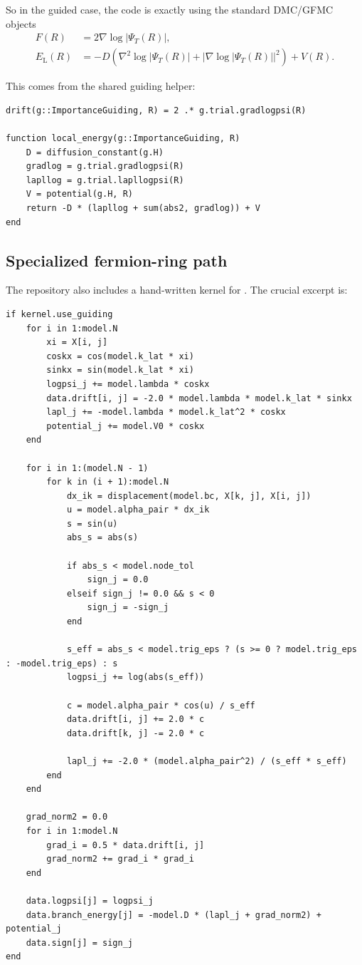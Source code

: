 \documentclass[11pt]{article}
\newcommand{\code}[1]{\texttt{\detokenize{#1}}}
\newcommand{\EL}{E_{\mathrm{L}}}
\begin{document}
So in the guided case, the code is exactly using the standard DMC/GFMC objects
\begin{align}
F(R) &= 2\nabla \log |\Psi_T(R)|, \\
\EL(R) &= -D\left(\nabla^2 \log |\Psi_T(R)| + |\nabla \log |\Psi_T(R)||^2\right) + V(R).
\end{align}

This comes from the shared guiding helper:

\begin{lstlisting}[style=codeblock,caption={\code{src/Domain/guiding.jl}}]
drift(g::ImportanceGuiding, R) = 2 .* g.trial.gradlogpsi(R)

function local_energy(g::ImportanceGuiding, R)
    D = diffusion_constant(g.H)
    gradlog = g.trial.gradlogpsi(R)
    lapllog = g.trial.lapllogpsi(R)
    V = potential(g.H, R)
    return -D * (lapllog + sum(abs2, gradlog)) + V
end
\end{lstlisting}

\subsection{Specialized fermion-ring path}

The repository also includes a hand-written kernel for
\code{SpinlessFermionRing1D}. The crucial excerpt is:

\begin{lstlisting}[style=codeblock,caption={Excerpt from \code{src/UseCases/gfmc/kernels.jl}}]
if kernel.use_guiding
    for i in 1:model.N
        xi = X[i, j]
        coskx = cos(model.k_lat * xi)
        sinkx = sin(model.k_lat * xi)
        logpsi_j += model.lambda * coskx
        data.drift[i, j] = -2.0 * model.lambda * model.k_lat * sinkx
        lapl_j += -model.lambda * model.k_lat^2 * coskx
        potential_j += model.V0 * coskx
    end

    for i in 1:(model.N - 1)
        for k in (i + 1):model.N
            dx_ik = displacement(model.bc, X[k, j], X[i, j])
            u = model.alpha_pair * dx_ik
            s = sin(u)
            abs_s = abs(s)

            if abs_s < model.node_tol
                sign_j = 0.0
            elseif sign_j != 0.0 && s < 0
                sign_j = -sign_j
            end

            s_eff = abs_s < model.trig_eps ? (s >= 0 ? model.trig_eps : -model.trig_eps) : s
            logpsi_j += log(abs(s_eff))

            c = model.alpha_pair * cos(u) / s_eff
            data.drift[i, j] += 2.0 * c
            data.drift[k, j] -= 2.0 * c

            lapl_j += -2.0 * (model.alpha_pair^2) / (s_eff * s_eff)
        end
    end

    grad_norm2 = 0.0
    for i in 1:model.N
        grad_i = 0.5 * data.drift[i, j]
        grad_norm2 += grad_i * grad_i
    end

    data.logpsi[j] = logpsi_j
    data.branch_energy[j] = -model.D * (lapl_j + grad_norm2) + potential_j
    data.sign[j] = sign_j
end
\end{lstlisting}
\end{document}
